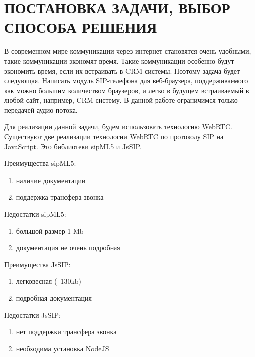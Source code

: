 \chapter{ПОСТАНОВКА ЗАДАЧИ, ВЫБОР СПОСОБА РЕШЕНИЯ}
В современном мире коммуникации через интернет становятся очень удобными, такие коммуникации экономят время. Такие коммуникации особенно будут экономить время, если их встраивать в CRM-системы. Поэтому задача будет следующая. Написать модуль SIP-телефона для веб-браузера, поддерживаемого как можно большим количеством браузеров, и легко в будущем встраиваемый в любой сайт, например, CRM-систему. В данной работе ограничимся только передачей аудио потока.

Для реализации данной задачи, будем использовать технологию WebRTC. Существуют две реализации технологии WebRTC по протоколу SIP на JavaScript. Это библиотеки sipML5 и JsSIP.

Преимущества sipML5:
\begin{enumerate}
\item наличие документации
\item поддержка трансфера звонка
\end{enumerate}

Недостатки sipML5:
\begin{enumerate}
\item большой размер 1 Mb
\item документация не очень подробная
\end{enumerate}

Преимущества JsSIP:
\begin{enumerate}
\item легковесная (~130kb)
\item подробная документация
\end{enumerate}

Недостатки JsSIP:
\begin{enumerate}
\item нет поддержки трансфера звонка
\item необходима установка NodeJS
\end{enumerate}
